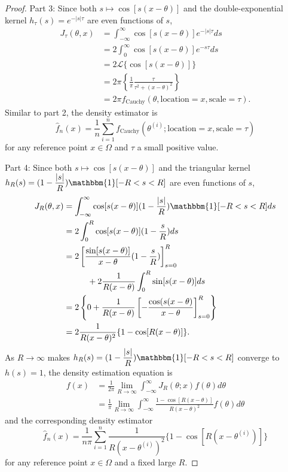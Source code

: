 \documentclass[%
 reprint,
 amsmath,amssymb,
 aps,
]{revtex4-2}
\begin{document}
\begin{proof}
    Part 3: Since both $s \mapsto \cos[s(x - \theta)]$ and the double-exponential kernel $h_\tau(s) = e^{-|s|\tau}$ are even functions of $s$,
    \begin{align*}
        J_\tau(\theta, x) & = \int_{-\infty}^\infty \cos[s(x - \theta)]e^{-|s|\tau}ds \\
        & = 2\int_0^\infty \cos[s(x - \theta)]e^{-s\tau}ds \\
        & = 2 \mathcal{L}\{\cos[s(x - \theta)]\} \\
        & = 2\pi \left\{\frac{1}{\pi}\frac{\tau}{\tau^2 + (x - \theta)^2}\right\} \\
        & = 2\pi f_\text{Cauchy}(\theta, \text{location} = x, \text{scale} = \tau).
    \end{align*}
    Similar to part 2, the density estimator is
    \begin{equation*}
        \hat{f}_n(x) = \frac{1}{n} \sum_{i = 1}^n f_\text{Cauchy}(\theta^{(i)}; \text{location} = x, \text{scale} = \tau)
    \end{equation*}
    for any reference point $x \in \Omega$ and $\tau$ a small positive value.

    Part 4: Since both $s \mapsto \cos[s(x - \theta)]$ and the triangular kernel $\displaystyle h_R(s) = (1 - \frac{|s|}{R}) \mathbbm{1}[-R < s < R]$ are even functions of $s$,
    \begin{align*}
        J_R(\theta, x) & = \int_{-\infty}^\infty \cos[s(x - \theta)](1 - \frac{|s|}{R}) \mathbbm{1}[-R < s < R]ds \\
        & = 2 \int_0^R \cos[s(x - \theta)](1 - \frac{s}{R}) ds \\
        & = 2\left[\frac{\sin[s(x - \theta)]}{x - \theta}(1 - \frac{s}{R}) \right]^R_{s = 0} \\
        & \hspace{1cm} + 2\frac{1}{R(x - \theta)}\int_0^R \sin[s(x - \theta)]ds \\
        & = 2\left\{0+\frac{1}{R(x - \theta)} \left[-\frac{\cos(s(x - \theta)}{x - \theta} \right]^R_{s = 0} \right\} \\
        & = 2\frac{1}{R(x - \theta)^2}\{1 - \cos[R(x - \theta)]\}.
    \end{align*}
    As $R \to \infty$ makes $\displaystyle h_R(s) = (1 - \frac{|s|}{R}) \mathbbm{1}[-R < s < R]$ converge to $h(s) = 1$, the density estimation equation is
    \begin{align*}
        f(x) & = \frac{1}{2\pi} \lim_{R \to \infty} \int_{-\infty}^\infty J_R(\theta; x) f(\theta)d\theta \\
        & = \frac{1}{\pi} \lim_{R \to \infty} \int_{-\infty}^\infty \frac{1 - \cos[R(x - \theta)]}{R(x - \theta)^2} f(\theta) d\theta
    \end{align*}
    and the corresponding density estimator
    \begin{equation*}
        \hat{f}_n(x) = \frac{1}{n\pi} \sum_{i = 1}^n \frac{1}{R(x - \theta^{(i)})^2}\{1 - \cos[R(x - \theta^{(i)})]\}
    \end{equation*}
    for any reference point $x \in \Omega$ and a fixed large $R$.


\end{proof}
\end{document}
